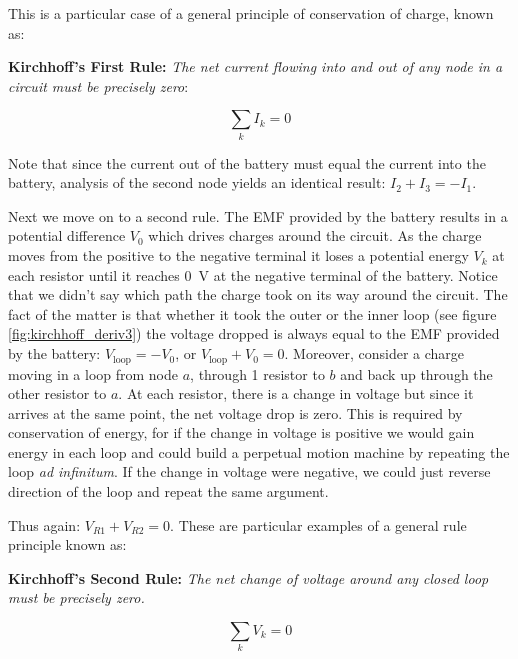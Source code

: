 \documentclass{tufte-book}
\begin{document}
This is a particular case of a general principle of conservation of charge, known as:

\noindent\textbf{Kirchhoff's First Rule:} \textit{The net current flowing into and out of any node in a circuit must be precisely zero}:

\begin{equation}\label{eq:Kirchhoff_I}
\boxed{\sum_kI_k=0}
\end{equation}

\noindent Note that since the current out of the battery must equal the current into the battery, analysis of the second node yields an identical result: $I_2 + I_3 = -I_1$.

Next we move on to a second rule. The EMF provided by the battery results in a potential difference $V_0$ which drives charges around the circuit. As the charge moves from the positive to the negative terminal it loses a potential energy $V_k$ at each resistor until it reaches 0~V at the negative terminal of the battery. Notice that we didn't say which path the charge took on its way around the circuit. The fact of the matter is that whether it took the outer or the inner loop (see figure \ref{fig:kirchhoff_deriv3}) the voltage dropped is always equal to the EMF provided by the battery: $V_\text{loop} = -V_0$, or $V_\text{loop}+V_0 = 0$. Moreover, consider a charge moving in a loop from node $a$, through 1 resistor to $b$ and back up through the other resistor to $a$. At each resistor, there is a change in voltage but since it arrives at the same point, the net voltage drop is zero. This is required by conservation of energy, for if the change in voltage is positive we would gain energy in each loop and could build a perpetual motion machine by repeating the loop \textit{ad infinitum}. If the change in voltage were negative, we could just reverse direction of the loop and repeat the same argument. 

Thus again: $V_{R1} + V_{R2} = 0$. These are particular examples of a general rule principle known as:

\noindent\textbf{Kirchhoff's Second Rule:} \textit{The net change of voltage around any closed loop must be precisely zero.}

$$
\boxed{\sum_kV_k=0}
$$
\end{document}
